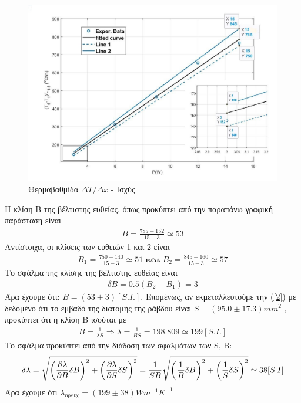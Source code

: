 \documentclass[a4paper]{article}
\begin{document}
\begin{figure}[h!]
\centering
\caption{ Θερμαβαθμίδα $\Delta T/\Delta x$ - Ισχύς }
\includegraphics[scale=0.8]{pDxDt.jpg}
\end{figure}



Η κλίση Β της βέλτιστης ευθείας, όπως προκύπτει από την παραπάνω γραφική παράσταση είναι 
\begin{align*}
B=\frac{785-152}{15-3} \simeq 53
\end{align*}
Αντίστοιχα, οι κλίσεις των ευθειών 1 και 2 είναι 
\begin{align*}
B_1 = \frac{750-140}{15-3} \simeq 51  \textbf{ και }
B_2 = \frac{845-160}{15-3} \simeq 57
\end{align*}
Το σφάλμα της κλίσης της βέλτιστης ευθείας είναι 
\begin{align*}
\delta B = 0.5(B_2-B_1) = 3
\end{align*}
Άρα έχουμε ότι: $B = (53\pm3) [S.I.]$.
Επομένως, αν εκμεταλλευτούμε την (\ref{2}) με δεδομένο ότι το εμβαδό της διατομής της ράβδου είναι $S=(95.0\pm17.3)mm^2$  \footnotemark, προκύπτει ότι η κλίση Β ισούται με 
\begin{align*}
B = \frac{1}{\lambda S} \Rightarrow \lambda =\frac{1}{BS} = 198.809\simeq199   [S.I.]
\end{align*}
Το σφάλμα προκύπτει από την διάδοση των σφαλμάτων των S, B:
\begin{align*}
\delta \lambda=\sqrt{\left( \pdv{\lambda}{B}\delta B \right)^2+\left( \pdv{\lambda}{S}\delta S\right)^2} = \frac{1}{SB}
\sqrt{\left( \frac{1}{B}\delta B\right)^2+\left( \frac{1}{S}\delta S \right)^2} \simeq 38  [S.I]
\end{align*}
Άρα έχουμε ότι $\boxed{\lambda_{\text{ορειχ}}=(199\pm38)Wm^{-1}K^{-1}}$
\end{document}
